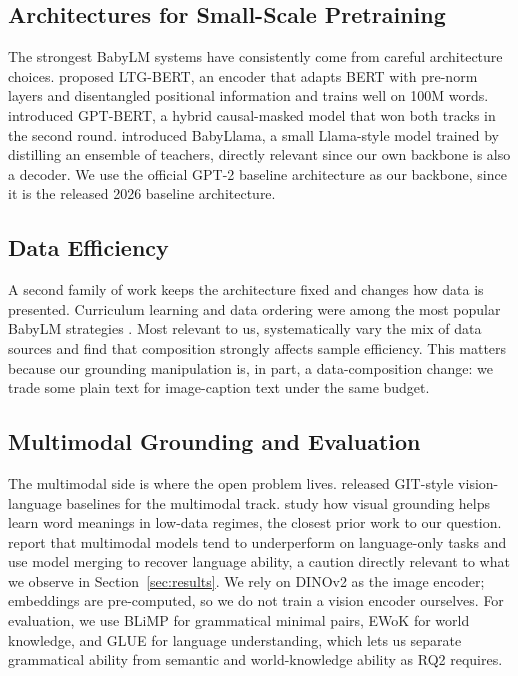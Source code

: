 \documentclass[11pt]{article}
\begin{document}
\subsection{Architectures for Small-Scale Pretraining}
The strongest BabyLM systems have consistently come from careful architecture choices. \citet{samuel2023ltgbert} proposed LTG-BERT, an encoder that adapts BERT with pre-norm layers and disentangled positional information and trains well on 100M words. \citet{charpentier2024gptbert} introduced GPT-BERT, a hybrid causal-masked model that won both tracks in the second round. \citet{timiryasov2023babyllama} introduced BabyLlama, a small Llama-style model trained by distilling an ensemble of teachers, directly relevant since our own backbone is also a decoder. We use the official GPT-2 baseline \citep{radford2019gpt2} architecture as our backbone, since it is the released 2026 baseline architecture.

\subsection{Data Efficiency}
A second family of work keeps the architecture fixed and changes how data is presented. Curriculum learning and data ordering were among the most popular BabyLM strategies \citep{warstadt2023findings}. Most relevant to us, \citet{tabbaa2024whatshould} systematically vary the mix of data sources and find that composition strongly affects sample efficiency. This matters because our grounding manipulation is, in part, a data-composition change: we trade some plain text for image-caption text under the same budget.

\subsection{Multimodal Grounding and Evaluation}
The multimodal side is where the open problem lives. \citet{choshen2024findings} released GIT-style vision-language baselines \citep{wang2022git} for the multimodal track. \citet{zhuang2024multimodal} study how visual grounding helps learn word meanings in low-data regimes, the closest prior work to our question. \citet{amariucai2025modelmerging} report that multimodal models tend to underperform on language-only tasks and use model merging to recover language ability, a caution directly relevant to what we observe in Section~\ref{sec:results}. We rely on DINOv2 \citep{oquab2023dinov2} as the image encoder; embeddings are pre-computed, so we do not train a vision encoder ourselves. For evaluation, we use BLiMP \citep{warstadt2020blimp} for grammatical minimal pairs, EWoK \citep{ivanova2024ewok} for world knowledge, and GLUE \citep{wang2018glue} for language understanding, which lets us separate grammatical ability from semantic and world-knowledge ability as RQ2 requires.
\end{document}
